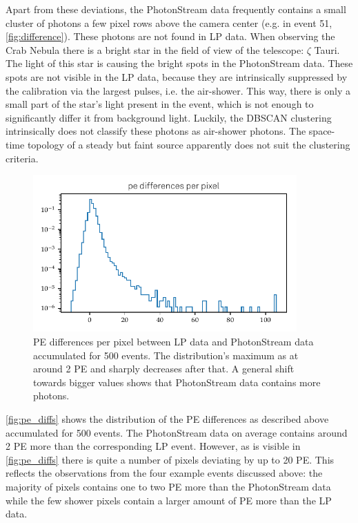Apart from these deviations, the PhotonStream data frequently contains a small
cluster of photons a few pixel rows above the camera center (e.g. in event 51,
\autoref{fig:difference}). These photons are not found in LP data. When
observing the Crab Nebula there is a bright star in the field of view of
the telescope: $\zeta$ Tauri. The light of this star is causing the bright spots in
the PhotonStream data. These spots are not visible in the LP data, because
they are intrinsically suppressed by the calibration via the largest pulses, i.e. the
air-shower. This way, there is only a small part of the star's light present in
the event, which is not enough to significantly differ it from background
light. Luckily, the DBSCAN clustering intrinsically does not classify these
photons as air-shower photons. The space-time topology of a steady but faint
source apparently does not suit the clustering criteria.
%
\begin{figure}
  \centering
  \includegraphics[width=0.9\textwidth]{Plots/diffs_hist_DBSCAN_pe_20131104_162_logy.pdf}
  \caption{PE differences per pixel between LP data and PhotonStream data accumulated for 500 events. The distribution's maximum as at around 2 PE and sharply decreases after that. A general shift towards bigger values shows that PhotonStream data contains more photons.}
  \label{fig:pe_diffs}
\end{figure}
%

\autoref{fig:pe_diffs} shows the distribution of the PE differences as
described above accumulated for 500 events. The PhotonStream data on average
contains around 2 PE more than the corresponding LP event. However, as is
visible in \autoref{fig:pe_diffs} there is quite a number of pixels deviating
by up to 20 PE. This reflects the observations from the four example events
discussed above: the majority of pixels contains one to two PE more than the
PhotonStream data while the few shower pixels contain a larger amount of PE
more than the LP data.

